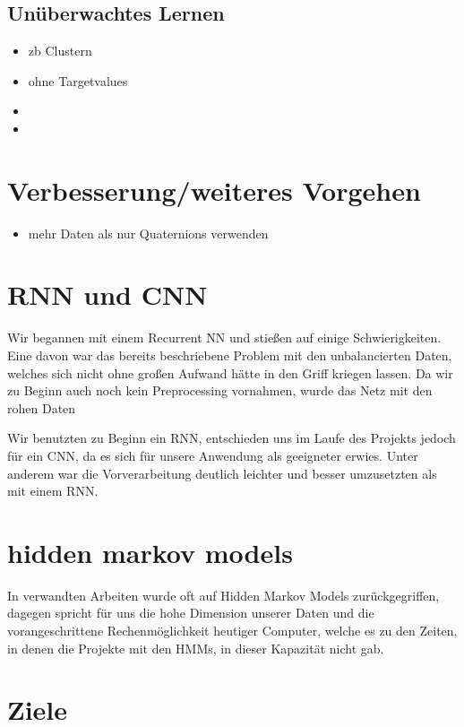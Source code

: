 \subsection{Unüberwachtes Lernen}
    \begin{itemize}
        \item zb Clustern
        \item ohne Targetvalues
        \item
        \item
    \end{itemize}

\section{Verbesserung/weiteres Vorgehen}
\begin{itemize}
    \item mehr Daten als nur Quaternions verwenden
\end{itemize}

\section{RNN und CNN}
Wir begannen mit einem Recurrent NN und stießen auf einige Schwierigkeiten. Eine davon war das bereits beschriebene Problem mit den unbalancierten Daten, welches sich nicht ohne großen Aufwand hätte in den Griff kriegen lassen. Da wir zu Beginn auch noch kein Preprocessing vornahmen, wurde das Netz mit den rohen Daten

 Wir benutzten zu Beginn ein RNN, entschieden uns im Laufe des Projekts jedoch für ein CNN, da es sich für unsere Anwendung als geeigneter erwies. Unter anderem war die Vorverarbeitung deutlich leichter und besser umzusetzten als mit einem RNN.

\section{hidden markov models}
In verwandten Arbeiten wurde oft auf Hidden Markov Models zurückgegriffen, dagegen spricht für uns die hohe Dimension unserer Daten und die vorangeschrittene Rechenmöglichkeit heutiger Computer, welche es zu den Zeiten, in denen die Projekte mit den HMMs, in dieser Kapazität nicht gab.

\section{Ziele}



